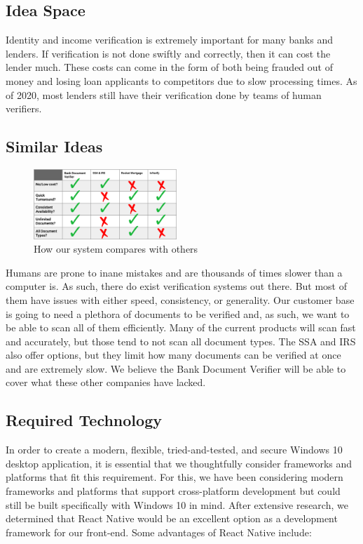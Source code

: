 \subsection{Idea Space}

Identity and income verification is extremely important for many banks and lenders. If verification is not done swiftly and correctly, then it can cost the lender much. These costs can come in the form of both being frauded out of money and losing loan applicants to competitors due to slow processing times. As of 2020, most lenders still have their verification done by teams of human verifiers.

\subsection{Similar Ideas}

\begin{figure}
    \centering
    \includegraphics[width=0.48\textwidth]{assets/comparison-table.png}
    \caption{How our system compares with others}
\end{figure}

Humans are prone to inane mistakes and are thousands of times slower than a computer is. As such, there do exist verification systems out there. But most of them have issues with either speed, consistency, or generality. Our customer base is going to need a plethora of documents to be verified and, as such, we want to be able to scan all of them efficiently. Many of the current products will scan fast and accurately, but those tend to not scan all document types. The SSA and IRS also offer options, but they limit how many documents can be verified at once and are extremely slow. We believe the Bank Document Verifier will be able to cover what these other companies have lacked.

\subsection{Required Technology}

In order to create a modern, flexible, tried-and-tested, and secure Windows 10 desktop application, it is essential that we thoughtfully consider frameworks and platforms that fit this requirement. For this, we have been considering modern frameworks and platforms that support cross-platform development but could still be built specifically with Windows 10 in mind. After extensive research, we determined that React Native would be an excellent option as a development framework for our front-end. Some advantages of React Native include: 

